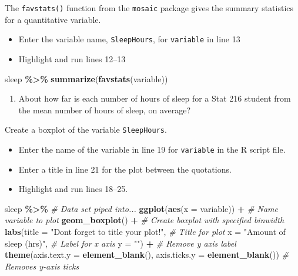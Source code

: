 \documentclass[
]{report}
\newenvironment{Shaded}{\begin{snugshade}}{\end{snugshade}}
\newcommand{\AttributeTok}[1]{\textcolor[rgb]{0.13,0.29,0.53}{#1}}
\newcommand{\CommentTok}[1]{\textcolor[rgb]{0.56,0.35,0.01}{\textit{#1}}}
\newcommand{\FunctionTok}[1]{\textcolor[rgb]{0.13,0.29,0.53}{\textbf{#1}}}
\newcommand{\NormalTok}[1]{#1}
\newcommand{\SpecialCharTok}[1]{\textcolor[rgb]{0.81,0.36,0.00}{\textbf{#1}}}
\newcommand{\StringTok}[1]{\textcolor[rgb]{0.31,0.60,0.02}{#1}}
\providecommand{\tightlist}{%
  \setlength{\itemsep}{0pt}\setlength{\parskip}{0pt}}
\begin{document}
The \texttt{favstats()} function from the \texttt{mosaic} package gives the summary statistics for a quantitative variable.

\begin{itemize}
\item
  Enter the variable name, \texttt{SleepHours}, for \texttt{variable} in line 13
\item
  Highlight and run lines 12--13
\end{itemize}

\begin{Shaded}
\begin{Highlighting}[]
\NormalTok{sleep }\SpecialCharTok{\%\textgreater{}\%}
    \FunctionTok{summarize}\NormalTok{(}\FunctionTok{favstats}\NormalTok{(variable))}
\end{Highlighting}
\end{Shaded}

\begin{enumerate}
\def\labelenumi{\arabic{enumi}.}
\tightlist
\item
  About how far is each number of hours of sleep for a Stat 216 student from the mean number of hours of sleep, on average?
\end{enumerate}

\vspace{0.3in}

Create a boxplot of the variable \texttt{SleepHours}.

\begin{itemize}
\item
  Enter the name of the variable in line 19 for \texttt{variable} in the R script file.
\item
  Enter a title in line 21 for the plot between the quotations.
\item
  Highlight and run lines 18--25.
\end{itemize}

\begin{Shaded}
\begin{Highlighting}[]
\NormalTok{sleep }\SpecialCharTok{\%\textgreater{}\%} \CommentTok{\# Data set piped into...}
    \FunctionTok{ggplot}\NormalTok{(}\FunctionTok{aes}\NormalTok{(}\AttributeTok{x =}\NormalTok{ variable)) }\SpecialCharTok{+}   \CommentTok{\# Name variable to plot}
    \FunctionTok{geom\_boxplot}\NormalTok{() }\SpecialCharTok{+}  \CommentTok{\# Create boxplot with specified binwidth}
    \FunctionTok{labs}\NormalTok{(}\AttributeTok{title =} \StringTok{"Don\textquotesingle{}t forget to title your plot!"}\NormalTok{, }\CommentTok{\# Title for plot}
       \AttributeTok{x =} \StringTok{"Amount of sleep (hrs)"}\NormalTok{, }\CommentTok{\# Label for x axis}
       \AttributeTok{y =} \StringTok{""}\NormalTok{) }\SpecialCharTok{+} \CommentTok{\# Remove y axis label}
    \FunctionTok{theme}\NormalTok{(}\AttributeTok{axis.text.y =} \FunctionTok{element\_blank}\NormalTok{(), }
          \AttributeTok{axis.ticks.y =} \FunctionTok{element\_blank}\NormalTok{()) }\CommentTok{\# Removes y{-}axis ticks}
\end{Highlighting}
\end{Shaded}
\end{document}
